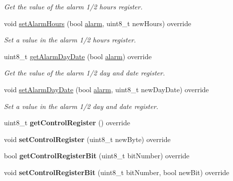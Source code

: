 \begin{DoxyCompactItemize}
\begin{DoxyCompactList}\small\item\em Get the value of the alarm 1/2 hours register. \end{DoxyCompactList}\item 
void \mbox{\hyperlink{class_d_s3231_a0bcc7e2285869ffbe29d19c593f5a447}{set\+Alarm\+Hours}} (bool \mbox{\hyperlink{classalarm}{alarm}}, uint8\+\_\+t new\+Hours) override
\begin{DoxyCompactList}\small\item\em Set a value in the alarm 1/2 hours register. \end{DoxyCompactList}\item 
uint8\+\_\+t \mbox{\hyperlink{class_d_s3231_a0b013c68f96b5145c1c9feb9270855a7}{get\+Alarm\+Day\+Date}} (bool \mbox{\hyperlink{classalarm}{alarm}}) override
\begin{DoxyCompactList}\small\item\em Get the value of the alarm 1/2 day and date register. \end{DoxyCompactList}\item 
void \mbox{\hyperlink{class_d_s3231_aa2048cc766ca58f707e84cbc564c1276}{set\+Alarm\+Day\+Date}} (bool \mbox{\hyperlink{classalarm}{alarm}}, uint8\+\_\+t new\+Day\+Date) override
\begin{DoxyCompactList}\small\item\em Set a value in the alarm 1/2 day and date register. \end{DoxyCompactList}\item 
\mbox{\label{class_d_s3231_a2e023e091c63208290e275874552a716}} 
uint8\+\_\+t {\bfseries get\+Control\+Register} () override
\item 
\mbox{\label{class_d_s3231_a1151a22a8dd47470b22562cedae114e9}} 
void {\bfseries set\+Control\+Register} (uint8\+\_\+t new\+Byte) override
\item 
\mbox{\label{class_d_s3231_a5b22edafc0d475fd6e33936c286654d5}} 
bool {\bfseries get\+Control\+Register\+Bit} (uint8\+\_\+t bit\+Number) override
\item 
\mbox{\label{class_d_s3231_a9ed1255adb58ecd03a541a4d481496c4}} 
void {\bfseries set\+Control\+Register\+Bit} (uint8\+\_\+t bit\+Number, bool new\+Bit) override
\item 

\end{DoxyCompactItemize}
